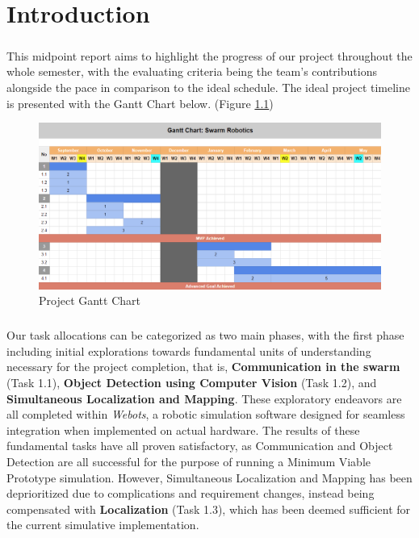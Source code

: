 \chapter{Introduction}

\paragraph*{}
This midpoint report aims to highlight the progress of our project throughout the whole semester, with the evaluating criteria being the team's contributions alongside the pace in comparison to the ideal schedule. The ideal project timeline is presented with the Gantt Chart below. (Figure \ref{fig:gantt-chart})

\begin{figure} [H]
    \centering
    \includegraphics[width=1\linewidth]{midpoint_report/assets/images/introduction/gantt_chart.png}
    \caption{Project Gantt Chart}
    \label{fig:gantt-chart}
\end{figure}

\paragraph*{}
Our task allocations can be categorized as two main phases, with the first phase including initial explorations towards fundamental units of understanding necessary for the project completion, that is, \textbf{Communication in the swarm} (Task 1.1), \textbf{Object Detection using Computer Vision} (Task 1.2), and \textbf{Simultaneous Localization and Mapping}. These exploratory endeavors are all completed within \textit{Webots}, a robotic simulation software designed for seamless integration when implemented on actual hardware. The results of these fundamental tasks have all proven satisfactory, as Communication and Object Detection are all successful for the purpose of running a Minimum Viable Prototype simulation. However, Simultaneous Localization and Mapping has been deprioritized due to complications and requirement changes, instead being compensated with \textbf{Localization} (Task 1.3), which has been deemed sufficient for the current simulative implementation.


